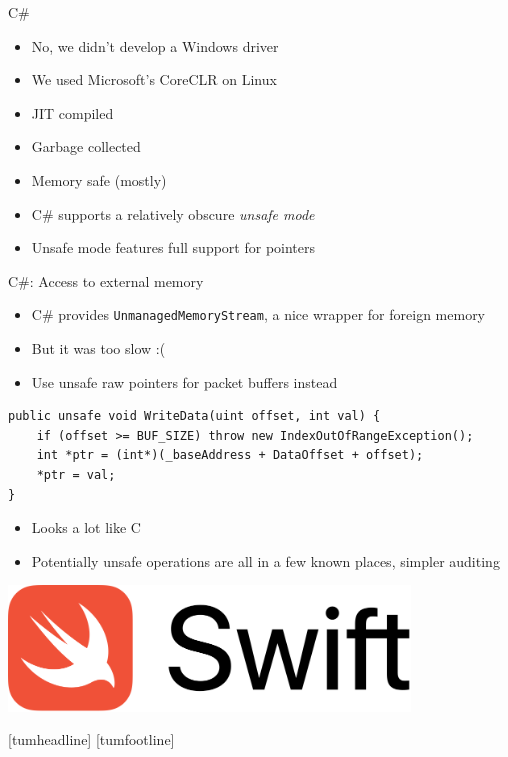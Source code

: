 \documentclass[NET,english,aspectratio=169,notitleframe]{tumbeamer}
\begin{document}
\begin{frame}{C\#}
\begin{itemize}
\item No, we didn't develop a Windows driver
\item We used Microsoft's CoreCLR on Linux
\pause
\vspace{1em}
\item JIT compiled
\item Garbage collected
\item Memory safe (mostly)
\pause
\vspace{1em}
\item C\# supports a relatively obscure \emph{unsafe mode}
\item Unsafe mode features full support for pointers
\end{itemize}
\end{frame}

\begin{frame}[fragile]{C\#: Access to external memory}
\begin{itemize}
\item C\# provides \texttt{UnmanagedMemoryStream}, a nice wrapper for foreign memory
\item But it was too slow :(
\pause
\item Use unsafe raw pointers for packet buffers instead
\end{itemize}
\begin{verbatim}
public unsafe void WriteData(uint offset, int val) {
    if (offset >= BUF_SIZE) throw new IndexOutOfRangeException();
    int *ptr = (int*)(_baseAddress + DataOffset + offset);
    *ptr = val;
}
\end{verbatim}
\begin{itemize}
\pause
\item Looks a lot like C
\item Potentially unsafe operations are all in a few known places, simpler auditing
\end{itemize}
\end{frame}



\begin{frame}{}
\centering\includegraphics[width=0.8\textwidth]{pics/swift}
\end{frame}
[tumheadline]
[tumfootline]
\end{document}
